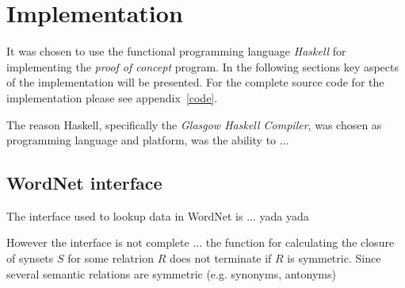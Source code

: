 
\chapter{Implementation}
\label{chap:implementation}

It was chosen to use the functional programming language \emph{Haskell} for implementing the \emph{proof of concept} program. In the following sections key aspects of the implementation will be presented. For the complete source code for the implementation please see appendix~\ref{code}.

The reason Haskell, specifically the \emph{Glasgow Haskell Compiler}, was chosen as programming language and platform, was the ability to ... 
\clearpage

\cite{cs}

\section{WordNet interface}
The interface used to lookup data in WordNet is ... yada yada

However the interface is not complete ... the function for calculating the closure of synsets $S$ for some relatrion $R$ does not terminate if $R$ is symmetric. Since several semantic relations are symmetric (e.g. synonyms, antonyms)